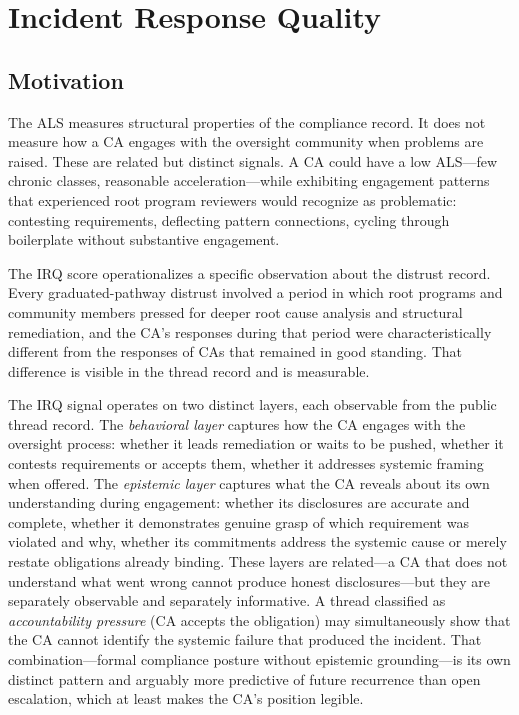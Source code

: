 \documentclass[10pt,twocolumn,letterpaper]{article}
\begin{document}
\section{Incident Response Quality}
\label{sec:irq}

\subsection{Motivation}

The ALS measures structural properties of the compliance record. It does not measure how
a CA engages with the oversight community when problems are raised. These are related but
distinct signals. A CA could have a low ALS---few chronic classes, reasonable
acceleration---while exhibiting engagement patterns that experienced root program reviewers
would recognize as problematic: contesting requirements, deflecting pattern connections,
cycling through boilerplate without substantive engagement.

The IRQ score operationalizes a specific observation about the distrust record. Every
graduated-pathway distrust involved a period in which root programs and community members
pressed for deeper root cause analysis and structural remediation, and the CA's responses
during that period were characteristically different from the responses of CAs that
remained in good standing. That difference is visible in the thread record and is
measurable.

The IRQ signal operates on two distinct layers, each observable from the public thread
record. The \textit{behavioral layer} captures how the CA engages with the oversight
process: whether it leads remediation or waits to be pushed, whether it contests
requirements or accepts them, whether it addresses systemic framing when offered. The
\textit{epistemic layer} captures what the CA reveals about its own understanding during
engagement: whether its disclosures are accurate and complete, whether it demonstrates
genuine grasp of which requirement was violated and why, whether its commitments address
the systemic cause or merely restate obligations already binding. These layers are
related---a CA that does not understand what went wrong cannot produce honest
disclosures---but they are separately observable and separately informative. A thread
classified as \textit{accountability pressure} (CA accepts the obligation) may
simultaneously show that the CA cannot identify the systemic failure that produced the
incident. That combination---formal compliance posture without epistemic grounding---is
its own distinct pattern and arguably more predictive of future recurrence than open
escalation, which at least makes the CA's position legible.
\end{document}
